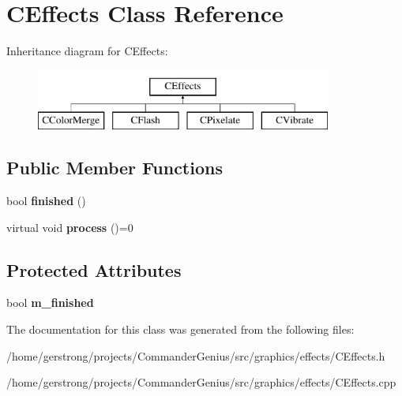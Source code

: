 \hypertarget{class_c_effects}{
\section{CEffects Class Reference}
\label{class_c_effects}
}
Inheritance diagram for CEffects:\begin{figure}[H]
\begin{center}
\leavevmode
\includegraphics[height=2cm]{class_c_effects}
\end{center}
\end{figure}
\subsection*{Public Member Functions}
\begin{DoxyCompactItemize}
\item 
\hypertarget{class_c_effects_ac12ef73f98e186304b33ee88fd1a4581}{
bool {\bfseries finished} ()}
\label{class_c_effects_ac12ef73f98e186304b33ee88fd1a4581}

\item 
\hypertarget{class_c_effects_aa60a4c39d25239b26ca526ce53a923c9}{
virtual void {\bfseries process} ()=0}
\label{class_c_effects_aa60a4c39d25239b26ca526ce53a923c9}

\end{DoxyCompactItemize}
\subsection*{Protected Attributes}
\begin{DoxyCompactItemize}
\item 
\hypertarget{class_c_effects_a9c8c70c5919ddca63c06156173145f80}{
bool {\bfseries m\_\-finished}}
\label{class_c_effects_a9c8c70c5919ddca63c06156173145f80}

\end{DoxyCompactItemize}


The documentation for this class was generated from the following files:\begin{DoxyCompactItemize}
\item 
/home/gerstrong/projects/CommanderGenius/src/graphics/effects/CEffects.h\item 
/home/gerstrong/projects/CommanderGenius/src/graphics/effects/CEffects.cpp\end{DoxyCompactItemize}

